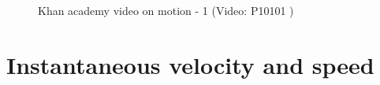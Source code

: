     \setcounter{subfigure}{0}
	\begin{figure}[H] %
    \textnormal{Khan academy video on motion - 1} \nopagebreak
  \label{m38794*yt-media1}\label{m38794*yt-video1}
             { (Video:  P10101 )}
 \end{figure}       \par 
\nopagebreak
\section{Instantaneous velocity and speed}


